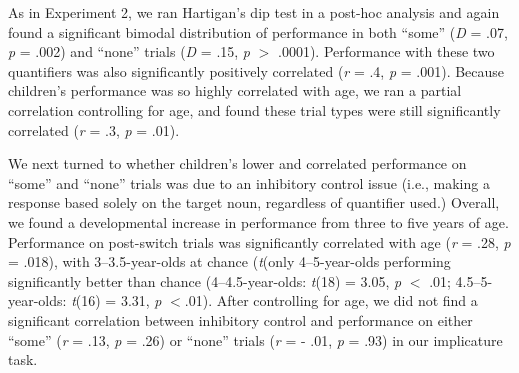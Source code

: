 \documentclass[man]{apa2}
\begin{document}

As in Experiment 2, we ran Hartigan's dip test in a post-hoc analysis and again found a significant bimodal distribution of performance in both ``some'' (\textit{D} = .07, \textit{p} = .002) and ``none'' trials (\textit{D} = .15, \textit{p} $>$ .0001). Performance with these two quantifiers was also significantly positively correlated (\emph{r} = .4, \emph{p} = .001). Because children's performance was so highly correlated with age, we ran a partial correlation controlling for age, and found these trial types were still significantly correlated (\emph{r} = .3, \emph{p} = .01).


%

We next turned to whether children's lower and correlated performance on ``some'' and ``none'' trials was due to an inhibitory control issue (i.e., making a response based solely on the target noun, regardless of quantifier used.)
Overall, we found a developmental increase in performance from three to five years of age. Performance on post-switch trials was significantly correlated with age (\textit{r} = .28, \textit{p} = .018), with 3--3.5-year-olds at chance (\emph{t}(only 4--5-year-olds performing significantly better than chance (4--4.5-year-olds: \emph{t}(18) = 3.05, \emph{p} $<$ .01; 4.5--5-year-olds: \emph{t}(16) = 3.31, \emph{p} $< $.01). After controlling for age, we did not find a significant correlation between inhibitory control and performance on either ``some'' (\textit{r} = .13, \textit{p} = .26) or ``none'' trials (\textit{r} = - .01, \textit{p} = .93) in our implicature task.
\end{document}

